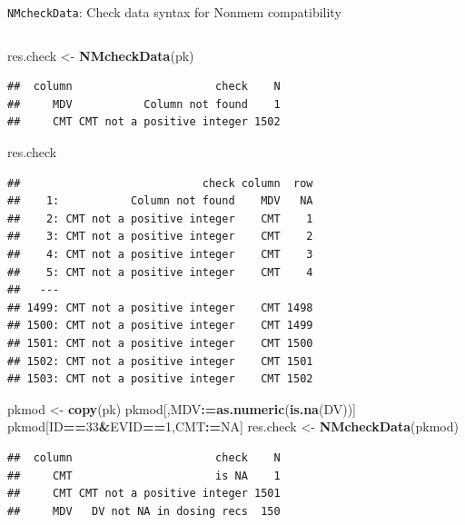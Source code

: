 \documentclass[
  8pt,
  ignorenonframetext,
  aspectratio=169]{beamer}
\newenvironment{Shaded}{\begin{snugshade}}{\end{snugshade}}
\newcommand{\DecValTok}[1]{\textcolor[rgb]{0.00,0.00,0.81}{#1}}
\newcommand{\ErrorTok}[1]{\textcolor[rgb]{0.64,0.00,0.00}{\textbf{#1}}}
\newcommand{\KeywordTok}[1]{\textcolor[rgb]{0.13,0.29,0.53}{\textbf{#1}}}
\newcommand{\NormalTok}[1]{#1}
\newcommand{\OperatorTok}[1]{\textcolor[rgb]{0.81,0.36,0.00}{\textbf{#1}}}
\newcommand{\OtherTok}[1]{\textcolor[rgb]{0.56,0.35,0.01}{#1}}
\newcommand{\StringTok}[1]{\textcolor[rgb]{0.31,0.60,0.02}{#1}}
\begin{document}
\begin{frame}[fragile]{\texttt{NMcheckData}: Check data syntax for
Nonmem compatibility}
\begin{columns}[T]
\begin{column}{0.48\textwidth}
\footnotesize

\begin{Shaded}
\begin{Highlighting}[]
\NormalTok{res.check \textless{}{-}}\StringTok{ }\KeywordTok{NMcheckData}\NormalTok{(pk)}
\end{Highlighting}
\end{Shaded}

\begin{verbatim}
##  column                      check    N
##     MDV           Column not found    1
##     CMT CMT not a positive integer 1502
\end{verbatim}

\begin{Shaded}
\begin{Highlighting}[]
\NormalTok{res.check}
\end{Highlighting}
\end{Shaded}

\begin{verbatim}
##                            check column  row
##    1:           Column not found    MDV   NA
##    2: CMT not a positive integer    CMT    1
##    3: CMT not a positive integer    CMT    2
##    4: CMT not a positive integer    CMT    3
##    5: CMT not a positive integer    CMT    4
##   ---                                       
## 1499: CMT not a positive integer    CMT 1498
## 1500: CMT not a positive integer    CMT 1499
## 1501: CMT not a positive integer    CMT 1500
## 1502: CMT not a positive integer    CMT 1501
## 1503: CMT not a positive integer    CMT 1502
\end{verbatim}

\begin{Shaded}
\begin{Highlighting}[]
\NormalTok{pkmod \textless{}{-}}\StringTok{ }\KeywordTok{copy}\NormalTok{(pk)}
\NormalTok{pkmod[,MDV}\OperatorTok{:}\ErrorTok{=}\KeywordTok{as.numeric}\NormalTok{(}\KeywordTok{is.na}\NormalTok{(DV))]}
\NormalTok{pkmod[ID}\OperatorTok{==}\DecValTok{33}\OperatorTok{\&}\NormalTok{EVID}\OperatorTok{==}\DecValTok{1}\NormalTok{,CMT}\OperatorTok{:}\ErrorTok{=}\OtherTok{NA}\NormalTok{]}
\NormalTok{res.check \textless{}{-}}\StringTok{ }\KeywordTok{NMcheckData}\NormalTok{(pkmod)}
\end{Highlighting}
\end{Shaded}

\begin{verbatim}
##  column                      check    N
##     CMT                      is NA    1
##     CMT CMT not a positive integer 1501
##     MDV   DV not NA in dosing recs  150
\end{verbatim}


\end{column}
\end{columns}
\end{frame}
\end{document}
